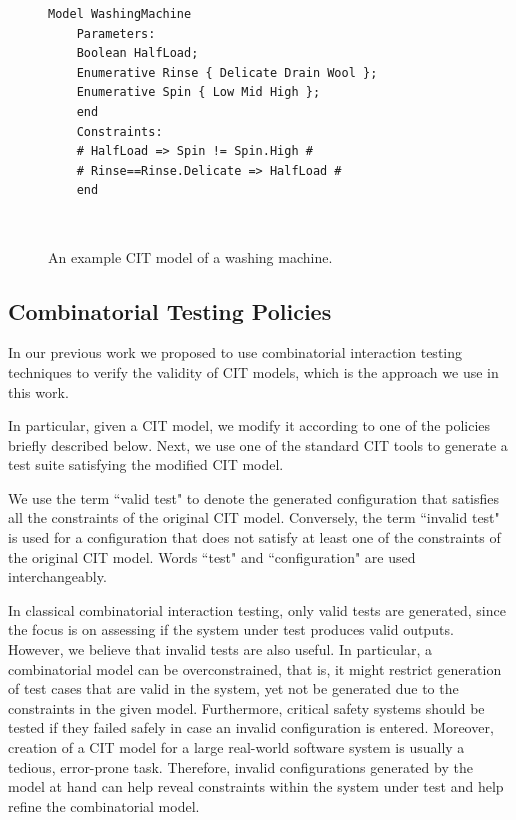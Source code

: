 \begin{tikzborder}{\cite{Gargantini16:validation}}
\begin{tikzborder}{\cite{gargantini_combinatorial_2017}}
\begin{figure}[h]
	\centering 
	\begin{lstlisting}[language=comb]
	Model WashingMachine
	Parameters:
	Boolean HalfLoad;
	Enumerative Rinse { Delicate Drain Wool };
	Enumerative Spin { Low Mid High };
	end
	Constraints:
	# HalfLoad => Spin != Spin.High #
	# Rinse==Rinse.Delicate => HalfLoad #
	end\end{lstlisting}
	\protect\caption{An example CIT model of a washing machine.}\
	\label{fig:washerexample} 
\end{figure}


\subsection{Combinatorial Testing Policies}
\label{sec:citpolicies}

\bb
In our previous work \cite{Gargantini16:validation} we proposed to use combinatorial interaction testing techniques to verify the validity of CIT models, which is the approach we use in this work. 

In particular, given a CIT model, we modify it according to one of the policies briefly described below. 
Next, we use one of the standard CIT tools to generate a test suite satisfying the modified CIT model. %

We use the term ``valid test" to denote the generated configuration that satisfies all the constraints of the original CIT model. Conversely, the term ``invalid test" is used for a configuration that does not satisfy at least one of the constraints of the original CIT model. Words ``test" and ``configuration" are used interchangeably.

In classical combinatorial interaction testing, only valid tests are generated, since the focus is on assessing if the system under test produces valid outputs. 
However, we believe that invalid tests are also useful.  In particular, a combinatorial model can be overconstrained, that is, it might restrict generation of test cases that are valid in the system, yet not be generated due to the constraints in the given model. Furthermore, critical safety systems should be tested if they failed safely in case an invalid configuration is entered. Moreover, creation of a CIT model for a large real-world software system is usually a tedious, error-prone task. Therefore, invalid configurations generated by the model at hand can help reveal constraints within the system under test and help refine the combinatorial model.


\end{tikzborder}
\end{tikzborder}
